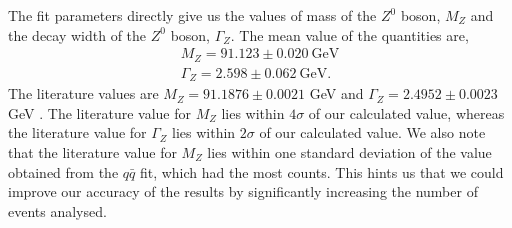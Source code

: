 The fit parameters directly give us the values of mass of the $Z^0$ boson, $M_Z$ and the decay width of the $Z^0$ boson, $\Gamma_Z$. The mean value of the quantities are,
\begin{equation}
\begin{split}
    M_Z = 91.123 \pm 0.020 ~ \text{GeV}\\
    \Gamma_Z = 2.598 \pm 0.062 ~ \text{GeV}.
\end{split}
\end{equation}
The literature values are $M_Z = 91.1876 \pm 0.0021$ GeV and $\Gamma_Z = 2.4952 \pm 0.0023$ GeV \cite{pdg2}. The literature value for $M_Z$ lies within $4\sigma$ of our calculated value, whereas the literature value for $\Gamma_Z$ lies within $2\sigma$ of our calculated value. We also note that the literature value for $M_Z$ lies within one standard deviation of the value obtained from the $q\bar{q}$ fit, which had the most counts. This hints us that we could improve our accuracy of the results by significantly increasing the number of events analysed.

